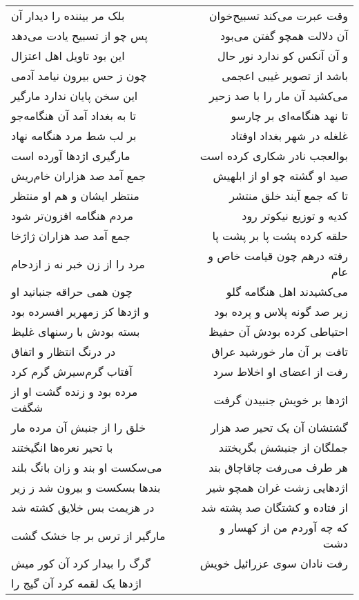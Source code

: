 \begin{center}
\begin{longtable}{l p{0.5cm} r}
بلک مر بیننده را دیدار آن
&&
وقت عبرت می‌کند تسبیح‌خوان
\\
پس چو از تسبیح یادت می‌دهد
&&
آن دلالت همچو گفتن می‌بود
\\
این بود تاویل اهل اعتزال
&&
و آن آنکس کو ندارد نور حال
\\
چون ز حس بیرون نیامد آدمی
&&
باشد از تصویر غیبی اعجمی
\\
این سخن پایان ندارد مارگیر
&&
می‌کشید آن مار را با صد زحیر
\\
تا به بغداد آمد آن هنگامه‌جو
&&
تا نهد هنگامه‌ای بر چارسو
\\
بر لب شط مرد هنگامه نهاد
&&
غلغله در شهر بغداد اوفتاد
\\
مارگیری اژدها آورده است
&&
بوالعجب نادر شکاری کرده است
\\
جمع آمد صد هزاران خام‌ریش
&&
صید او گشته چو او از ابلهیش
\\
منتظر ایشان و هم او منتظر
&&
تا که جمع آیند خلق منتشر
\\
مردم هنگامه افزون‌تر شود
&&
کدیه و توزیع نیکوتر رود
\\
جمع آمد صد هزاران ژاژخا
&&
حلقه کرده پشت پا بر پشت پا
\\
مرد را از زن خبر نه ز ازدحام
&&
رفته درهم چون قیامت خاص و عام
\\
چون همی حراقه جنبانید او
&&
می‌کشیدند اهل هنگامه گلو
\\
و اژدها کز زمهریر افسرده بود
&&
زیر صد گونه پلاس و پرده بود
\\
بسته بودش با رسنهای غلیظ
&&
احتیاطی کرده بودش آن حفیظ
\\
در درنگ انتظار و اتفاق
&&
تافت بر آن مار خورشید عراق
\\
آفتاب گرم‌سیرش گرم کرد
&&
رفت از اعضای او اخلاط سرد
\\
مرده بود و زنده گشت او از شگفت
&&
اژدها بر خویش جنبیدن گرفت
\\
خلق را از جنبش آن مرده مار
&&
گشتشان آن یک تحیر صد هزار
\\
با تحیر نعره‌ها انگیختند
&&
جملگان از جنبشش بگریختند
\\
می‌سکست او بند و زان بانگ بلند
&&
هر طرف می‌رفت چاقاچاق بند
\\
بندها بسکست و بیرون شد ز زیر
&&
اژدهایی زشت غران همچو شیر
\\
در هزیمت بس خلایق کشته شد
&&
از فتاده و کشتگان صد پشته شد
\\
مارگیر از ترس بر جا خشک گشت
&&
که چه آوردم من از کهسار و دشت
\\
گرگ را بیدار کرد آن کور میش
&&
رفت نادان سوی عزرائیل خویش
\\
اژدها یک لقمه کرد آن گیج را

\end{longtable}
\end{center}
